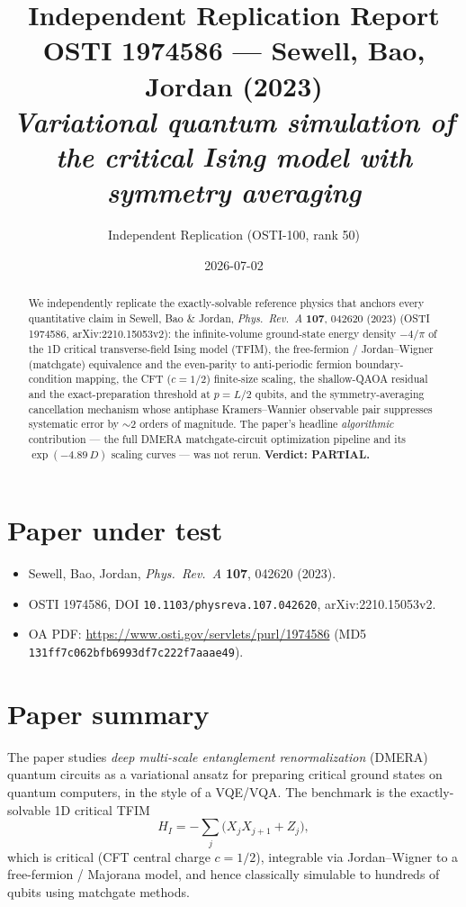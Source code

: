 \documentclass[11pt]{article}
\title{Independent Replication Report \\
  \large OSTI 1974586 --- Sewell, Bao, Jordan (2023) \\
  \emph{Variational quantum simulation of the critical Ising model
    with symmetry averaging}}
\author{Independent Replication (OSTI-100, rank 50)}
\date{2026-07-02}
\begin{document}
\maketitle

\begin{abstract}
We independently replicate the exactly-solvable reference physics that anchors
every quantitative claim in Sewell, Bao \& Jordan, \emph{Phys.\ Rev.\ A} \textbf{107},
042620 (2023) (OSTI 1974586, arXiv:2210.15053v2): the infinite-volume ground-state
energy density $-4/\pi$ of the 1D critical transverse-field Ising model (TFIM), the
free-fermion / Jordan--Wigner (matchgate) equivalence and the even-parity to
anti-periodic fermion boundary-condition mapping, the CFT ($c=1/2$) finite-size
scaling, the shallow-QAOA residual and the exact-preparation threshold at $p{=}L/2$
qubits, and the symmetry-averaging cancellation mechanism whose antiphase Kramers--Wannier
observable pair suppresses systematic error by $\sim$2 orders of magnitude.
The paper's headline \emph{algorithmic} contribution --- the full DMERA
matchgate-circuit optimization pipeline and its $\exp(-4.89\,D)$ scaling curves ---
was not rerun. \textbf{Verdict: PARTIAL.}
\end{abstract}

\section{Paper under test}
\begin{itemize}
  \item Sewell, Bao, Jordan, \emph{Phys.\ Rev.\ A} \textbf{107}, 042620 (2023).
  \item OSTI 1974586, DOI \texttt{10.1103/physreva.107.042620}, arXiv:2210.15053v2.
  \item OA PDF: \url{https://www.osti.gov/servlets/purl/1974586}
    (MD5 \texttt{131ff7c062bfb6993df7c222f7aaae49}).
\end{itemize}

\section{Paper summary}
The paper studies \emph{deep multi-scale entanglement renormalization} (DMERA)
quantum circuits as a variational ansatz for preparing critical ground states on
quantum computers, in the style of a VQE/VQA. The benchmark is the exactly-solvable
1D critical TFIM
\begin{equation}
  H_I = -\sum_j\!\bigl(X_j X_{j+1} + Z_j\bigr), \label{eq:HI}
\end{equation}
which is critical (CFT central charge $c=1/2$), integrable via Jordan--Wigner to a
free-fermion / Majorana model, and hence classically simulable to hundreds of qubits
using matchgate methods.
\end{document}
